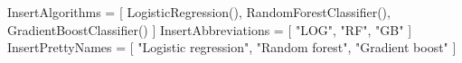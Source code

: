 InsertAlgorithms = [
  LogisticRegression(),
  RandomForestClassifier(),
  GradientBoostClassifier()
]
InsertAbbreviations = [
  "LOG", "RF", "GB"
]
InsertPrettyNames = [
  "Logistic regression",
  "Random forest",
  "Gradient boost"
]
